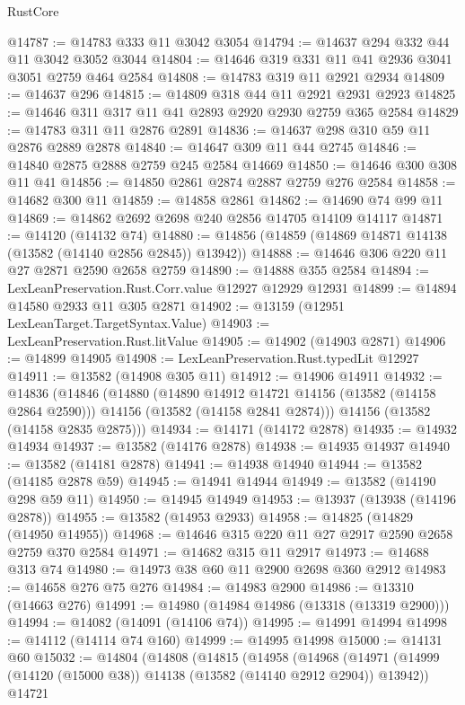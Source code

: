 \begin{lexlean}{RustCore}
\begin{coremodule}
@14787 := @14783 @333 @11 @3042 @3054
@14794 := @14637 @294 @332 @44 @11 @3042 @3052 @3044
@14804 := @14646 @319 @331 @11 @41 @2936 @3041 @3051 @2759 @464 @2584
@14808 := @14783 @319 @11 @2921 @2934
@14809 := @14637 @296
@14815 := @14809 @318 @44 @11 @2921 @2931 @2923
@14825 := @14646 @311 @317 @11 @41 @2893 @2920 @2930 @2759 @365 @2584
@14829 := @14783 @311 @11 @2876 @2891
@14836 := @14637 @298 @310 @59 @11 @2876 @2889 @2878
@14840 := @14647 @309 @11 @44 @2745
@14846 := @14840 @2875 @2888 @2759 @245 @2584 @14669
@14850 := @14646 @300 @308 @11 @41
@14856 := @14850 @2861 @2874 @2887 @2759 @276 @2584
@14858 := @14682 @300 @11
@14859 := @14858 @2861
@14862 := @14690 @74 @99 @11
@14869 := @14862 @2692 @2698 @240 @2856 @14705 @14109 @14117
@14871 := @14120 (@14132 @74)
@14880 := @14856 (@14859 (@14869 @14871 @14138 (@13582 (@14140 @2856 @2845)) @13942))
@14888 := @14646 @306 @220 @11 @27 @2871 @2590 @2658 @2759
@14890 := @14888 @355 @2584
@14894 := LexLeanPreservation.Rust.Corr.value @12927 @12929 @12931
@14899 := @14894 @14580 @2933 @11 @305 @2871
@14902 := @13159 (@12951 LexLeanTarget.TargetSyntax.Value)
@14903 := LexLeanPreservation.Rust.litValue
@14905 := @14902 (@14903 @2871)
@14906 := @14899 @14905
@14908 := LexLeanPreservation.Rust.typedLit @12927
@14911 := @13582 (@14908 @305 @11)
@14912 := @14906 @14911
@14932 := @14836
    (@14846
      (@14880
        (@14890 @14912 @14721 @14156 (@13582 (@14158 @2864 @2590)))
        @14156
        (@13582 (@14158 @2841 @2874)))
      @14156
      (@13582 (@14158 @2835 @2875)))
@14934 := @14171 (@14172 @2878)
@14935 := @14932 @14934
@14937 := @13582 (@14176 @2878)
@14938 := @14935 @14937
@14940 := @13582 (@14181 @2878)
@14941 := @14938 @14940
@14944 := @13582 (@14185 @2878 @59)
@14945 := @14941 @14944
@14949 := @13582 (@14190 @298 @59 @11)
@14950 := @14945 @14949
@14953 := @13937 (@13938 (@14196 @2878))
@14955 := @13582 (@14953 @2933)
@14958 := @14825 (@14829 (@14950 @14955))
@14968 := @14646 @315 @220 @11 @27 @2917 @2590 @2658 @2759 @370 @2584
@14971 := @14682 @315 @11 @2917
@14973 := @14688 @313 @74
@14980 := @14973 @38 @60 @11 @2900 @2698 @360 @2912
@14983 := @14658 @276 @75 @276
@14984 := @14983 @2900
@14986 := @13310 (@14663 @276)
@14991 := @14980 (@14984 @14986 (@13318 (@13319 @2900)))
@14994 := @14082 (@14091 (@14106 @74))
@14995 := @14991 @14994
@14998 := @14112 (@14114 @74 @160)
@14999 := @14995 @14998
@15000 := @14131 @60
@15032 := @14804
    (@14808
      (@14815
        (@14958
          (@14968
            (@14971 (@14999 (@14120 (@15000 @38)) @14138 (@13582 (@14140 @2912 @2904)) @13942))
            @14721

\end{coremodule}
\end{lexlean}
